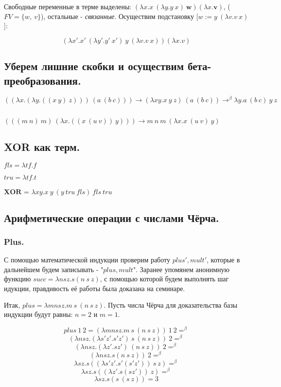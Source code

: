 \documentclass[a4paper,12pt]{article}
\theoremstyle{plain} %
\theoremstyle{definition} %
\theoremstyle{remark} %
\begin{document}
Свободные переменные в терме выделены: $(\lambda x. x \ (\lambda y. y \ x) \ \boldsymbol{w}) (\lambda x. \boldsymbol{v})$, ($FV = \{w, \ v\}$), остальные - \textit{связанные}. Осуществим подстановку [$w := y \ (\lambda v. v \ x)$]:

$$(\lambda x'. x' \ (\lambda y'. y' \ x') \ y \ (\lambda v. v \ x)) (\lambda x. v)$$

\subsection{Уберем лишние скобки и осуществим бета-преобразования.}
$((\lambda x. (\lambda y. ((x \ y) \ z))) \ (a \ (b \ c))) \longrightarrow (\lambda x y. x \ y \ z) \ (a \ (b \ c)) \rightarrow^{\beta} \lambda y. a \ (b \ c) \ y \ z$ 

$ $

$(((m \ n) \ m) \ ( \lambda x. ((x \ (u \ v)) \ y))) \longrightarrow m \ n \ m \ ( \lambda x. x \ (u \ v) \ y)$

\subsection{XOR как терм.}

$fls = \lambda t f. f$

$tru = \lambda t f. t$

$\boldsymbol{XOR}$ = $\lambda xy. x \ y \ (y \ tru \ fls) \ fls \ tru$

\subsection{Арифметические операции с числами Чёрча.}

\subsubsection{Plus.}

С помощью математической индукции проверим работу $plus', mult'$, которые в дальнейшем будем записывать - "$plus, mult$". Заранее упомянем анонимную функцию $succ = \lambda nsz. s(n \ s \ z)$, с помощью которой будем выполнять шаг идукции, правдивость её работы была доказана на семинаре.

Итак, $plus = \lambda m n s z. m \ s \ (n \ s \ z)$. Пусть числа Чёрча для доказательства базы индукции будут равны: $n = 2$ и $m = 1$. 

$$plus \ 1 \ 2 = (\lambda m n sz. m \ s \ ( n \ s \ z)) \ 1 \ 2 =^{\beta}$$
$$(\lambda n sz. (\lambda s' z'. s'z') \ s \ ( n \ s \ z)) \ 2 =^{\beta}$$
$$(\lambda n sz. (\lambda z'. sz') \ ( n \ s \ z)) \ 2 =^{\beta}$$
$$(\lambda n sz. s ( n \ s \ z)) \ 2 =^{\beta}$$
$$\lambda sz. s ( (\lambda s'z'. s'(s'z')) \ s \ z)=^{\beta}$$
$$\lambda sz. s ( (\lambda z'. s(sz')) \ z)=^{\beta}$$
$$\lambda sz. s ( s \ (s \ z))= 3$$
\end{document}
